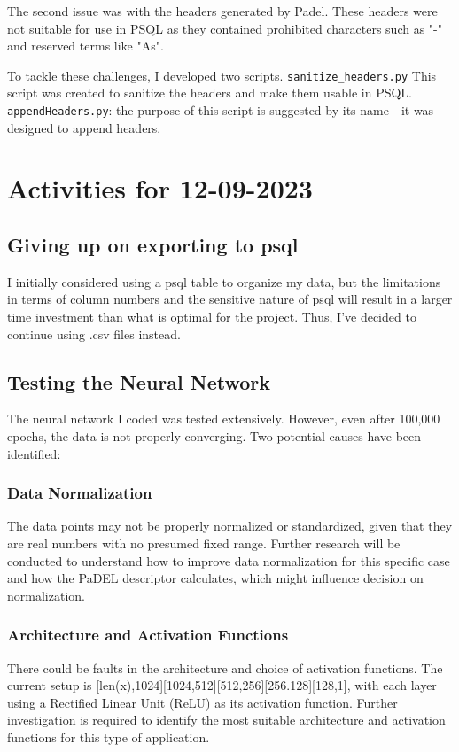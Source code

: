 \documentclass{article}
\begin{document}
The second issue was with the headers generated by Padel. These headers were not suitable for use in PSQL as they contained prohibited characters such as "-" and reserved terms like "As". 

To tackle these challenges, I developed two scripts. \texttt{sanitize\_headers.py} This script was created to sanitize the headers and make them usable in PSQL. \texttt{appendHeaders.py}: the purpose of this script is suggested by its name - it was designed to append headers. 

\section*{Activities for 12-09-2023}
\subsection*{Giving up on exporting to psql}
I initially considered using a psql table to organize my data, but the limitations in terms of column numbers and the sensitive nature of psql will result in a larger time investment than what is optimal for the project. Thus, I've decided to continue using .csv files instead.

\subsection*{Testing the Neural Network}
The neural network I coded was tested extensively. However, even after 100,000 epochs, the data is not properly converging. Two potential causes have been identified: 

\subsubsection*{Data Normalization} 
The data points may not be properly normalized or standardized, given that they are real numbers with no presumed fixed range. Further research will be conducted to understand how to improve data normalization for this specific case and how the PaDEL descriptor calculates, which might influence decision on normalization.

\subsubsection*{Architecture and Activation Functions}
There could be faults in the architecture and choice of activation functions. The current setup is [len(x),1024][1024,512][512,256][256.128][128,1], with each layer using a Rectified Linear Unit (ReLU) as its activation function. Further investigation is required to identify the most suitable architecture and activation functions for this type of application.
\end{document}
